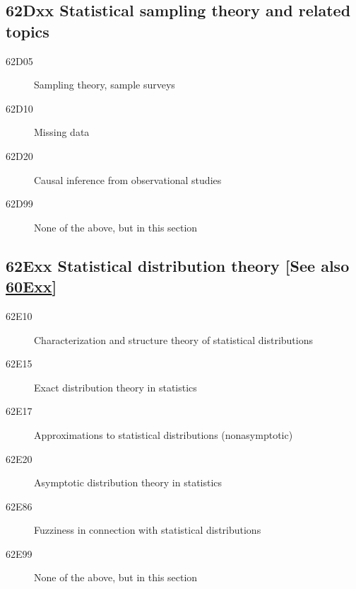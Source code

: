 \subsection*{62Dxx Statistical sampling theory and related topics}\label{62Dxx}
\begin{description}  
\item [62D05]\label{62D05} Sampling theory, sample surveys
\item [62D10]\label{62D10} Missing data 
\item [62D20]\label{62D20} Causal inference from observational studies
\item [62D99]\label{62D99} None of the above, but in this section
\end{description}
\subsection*{62Exx  Statistical distribution theory [See also \hyperref[60Exx]{60Exx}] }\label{62Exx}
\begin{description}  
\item [62E10]\label{62E10} Characterization  and structure theory of statistical distributions
\item [62E15]\label{62E15} Exact distribution theory in statistics
\item [62E17]\label{62E17} Approximations to statistical distributions (nonasymptotic)
\item [62E20]\label{62E20} Asymptotic distribution theory in statistics
\item [62E86]\label{62E86} Fuzziness in connection with statistical distributions
\item [62E99]\label{62E99} None of the above, but in this section
\end{description}
